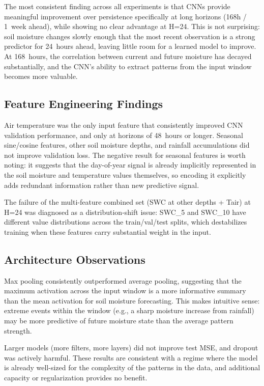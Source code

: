 \documentclass[11pt]{article}
\begin{document}
The most consistent finding across all experiments is that CNNs provide meaningful
improvement over persistence specifically at long horizons (168h / 1~week ahead),
while showing no clear advantage at H=24. This is not surprising: soil moisture
changes slowly enough that the most recent observation is a strong predictor for
24~hours ahead, leaving little room for a learned model to improve. At 168~hours, the
correlation between current and future moisture has decayed substantially, and the
CNN's ability to extract patterns from the input window becomes more valuable.

\subsection{Feature Engineering Findings}

Air temperature was the only input feature that consistently improved CNN validation
performance, and only at horizons of 48~hours or longer. Seasonal sine/cosine
features, other soil moisture depths, and rainfall accumulations did not improve
validation loss. The negative result for seasonal features is worth noting: it
suggests that the day-of-year signal is already implicitly represented in the soil
moisture and temperature values themselves, so encoding it explicitly adds redundant
information rather than new predictive signal.

The failure of the multi-feature combined set (SWC at other depths + Tair) at H=24
was diagnosed as a distribution-shift issue: SWC\_5 and SWC\_10 have different value
distributions across the train/val/test splits, which destabilizes training when these
features carry substantial weight in the input.

\subsection{Architecture Observations}

Max pooling consistently outperformed average pooling, suggesting that the maximum
activation across the input window is a more informative summary than the mean
activation for soil moisture forecasting. This makes intuitive sense: extreme events
within the window (e.g., a sharp moisture increase from rainfall) may be more
predictive of future moisture state than the average pattern strength.

Larger models (more filters, more layers) did not improve test MSE, and dropout
was actively harmful. These results are consistent with a regime where the model is
already well-sized for the complexity of the patterns in the data, and additional
capacity or regularization provides no benefit.
\end{document}
